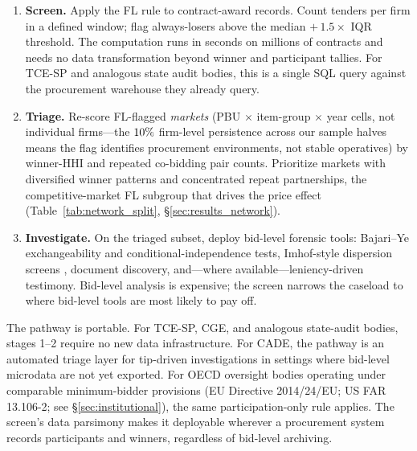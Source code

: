 \begin{enumerate}
\item \textbf{Screen.} Apply the FL rule to contract-award
records. Count tenders per firm in a defined window; flag
always-losers above the median $+\,1.5 \times$ IQR threshold.
The computation runs in seconds on millions of contracts and
needs no data transformation beyond winner and participant
tallies. For TCE-SP and analogous state audit bodies, this is
a single SQL query against the procurement warehouse they
already query.

\item \textbf{Triage.} Re-score FL-flagged \emph{markets}
(PBU $\times$ item-group $\times$ year cells, not individual
firms---the $10\%$ firm-level persistence across our sample
halves means the flag identifies procurement environments, not
stable operatives) by winner-HHI and repeated co-bidding pair
counts. Prioritize markets with diversified winner patterns
and concentrated repeat partnerships, the competitive-market
FL subgroup that drives the price effect
(Table~\ref{tab:network_split},
\S\ref{sec:results_network}).

\item \textbf{Investigate.} On the triaged subset, deploy
bid-level forensic tools: Bajari--Ye exchangeability and
conditional-independence tests, Imhof-style dispersion screens
\citep{imhof2019detecting, huber2019machine,
wallimann2023machine}, document discovery, and---where
available---leniency-driven testimony. Bid-level analysis is
expensive; the screen narrows the caseload to where bid-level
tools are most likely to pay off.
\end{enumerate}

The pathway is portable. For TCE-SP, CGE, and analogous
state-audit bodies, stages 1--2 require no new data
infrastructure. For CADE, the pathway is an automated triage
layer for tip-driven investigations in settings where
bid-level microdata are not yet exported. For OECD oversight
bodies operating under comparable minimum-bidder provisions
(EU Directive 2014/24/EU; US FAR 13.106-2; see
\S\ref{sec:institutional}), the same participation-only rule
applies. The screen's data parsimony makes it deployable
wherever a procurement system records participants and
winners, regardless of bid-level archiving.

